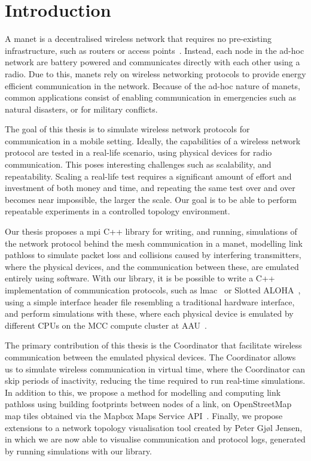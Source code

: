 \chapter{Introduction}\label{ch:introduction}
A \gls{manet} is a decentralised wireless network that requires no pre-existing infrastructure, such as
routers or access points~\cite{inproceedings:routingsurvery}. Instead, each node in the ad-hoc network are
battery powered and communicates directly with each other using a radio. Due to this, \gls{manet}s rely on
wireless networking protocols to provide energy efficient communication in the network. Because of the ad-hoc
nature of \gls{manet}s, common applications consist of enabling communication in emergencies such as
natural disasters, or for military conflicts.\smallbreak

The goal of this thesis is to simulate wireless network protocols for communication in a mobile setting.
Ideally, the capabilities of a wireless network protocol are tested in a real-life scenario, using physical
devices for radio communication. This poses interesting challenges such as scalability, and repeatability.
Scaling a real-life test requires a significant amount of effort and investment of both money and time, and
repeating the same test over and over becomes near impossible, the larger the scale. Our goal is to be able to
perform repeatable experiments in a controlled topology environment.\smallbreak

Our thesis proposes a \gls{mpi} C++ library for writing, and running, simulations of the network protocol
behind the mesh communication in a \gls{manet}, modelling link \gls{pathloss} to simulate packet loss and
collisions caused by interfering transmitters, where the physical devices, and the communication between
these, are emulated entirely using software. With our library, it is be possible to write a C++ implementation
of communication protocols, such as \gls{lmac}~\cite{paper:lmac_protocol} or Slotted
ALOHA~\cite{Roberts:1975:APS:1024916.1024920}, using a simple interface header file resembling a traditional
hardware interface, and perform simulations with these, where each physical device is emulated by different
CPUs on the MCC compute cluster at AAU~\cite{website:mccaau}. \smallbreak

The primary contribution of this thesis is the Coordinator that facilitate wireless communication between the
emulated physical devices. The Coordinator allows us to simulate wireless communication in virtual time, where
the Coordinator can skip periods of inactivity, reducing the time required to run real-time
simulations. In addition to this, we propose a method for modelling and computing link \gls{pathloss} using
building footprints between nodes of a link, on OpenStreetMap map tiles obtained via the Mapbox Maps Service
API~\cite{website:mapbox}. Finally, we propose extensions to a network topology visualisation tool created by
Peter Gjøl Jensen, in which we are now able to visualise communication and protocol logs, generated by running
simulations with our library.

